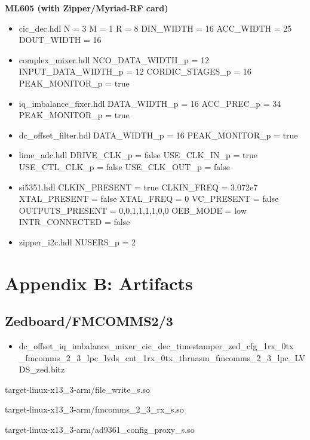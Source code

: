 \begin{minipage}[t]{.5\textwidth}
	\textbf{ML605 (with Zipper/Myriad-RF card)}
	\begin{itemize}
		\item cic\_dec.hdl
			\subitem N = 3
			\subitem M = 1
			\subitem R = 8
			\subitem DIN\_WIDTH = 16
			\subitem ACC\_WIDTH = 25
			\subitem DOUT\_WIDTH = 16
		\item complex\_mixer.hdl
			\subitem NCO\_DATA\_WIDTH\_p = 12
			\subitem INPUT\_DATA\_WIDTH\_p = 12
			\subitem CORDIC\_STAGES\_p = 16
			\subitem PEAK\_MONITOR\_p = true
		\item iq\_imbalance\_fixer.hdl
			\subitem DATA\_WIDTH\_p = 16
			\subitem ACC\_PREC\_p = 34
			\subitem PEAK\_MONITOR\_p = true
		\item dc\_offset\_filter.hdl
			\subitem DATA\_WIDTH\_p = 16
			\subitem PEAK\_MONITOR\_p = true
		\item lime\_adc.hdl
			\subitem DRIVE\_CLK\_p = false
			\subitem USE\_CLK\_IN\_p = true
			\subitem USE\_CTL\_CLK\_p = false
			\subitem USE\_CLK\_OUT\_p = false
		\item si5351.hdl
			\subitem CLKIN\_PRESENT = true
			\subitem CLKIN\_FREQ = 3.072e7
			\subitem XTAL\_PRESENT = false
			\subitem XTAL\_FREQ = 0
			\subitem VC\_PRESENT = false
			\subitem OUTPUTS\_PRESENT = 0,0,1,1,1,1,0,0
			\subitem OEB\_MODE = low
			\subitem INTR\_CONNECTED = false
		\item zipper\_i2c.hdl
			\subitem NUSERS\_p = 2
	\end{itemize}
\end{minipage}\newpage

\section{Appendix B: Artifacts}
\subsection{Zedboard/FMCOMMS2/3}
	\begin{itemize}
	\item dc\_offset\_iq\_imbalance\_mixer\_cic\_dec\_timestamper\_zed\_cfg\_1rx\_0tx \\ 
\_fmcomms\_2\_3\_lpc\_lvds\_cnt\_1rx\_0tx\_thruasm\_fmcomms\_2\_3\_lpc\_LVDS\_zed.bitz
	\end{itemize}
	\begin{itemize}
	\begin{minipage}[t]{.5\textwidth}
	\item target-linux-x13\_3-arm/file\_write\_s.so
	\item target-linux-x13\_3-arm/fmcomms\_2\_3\_rx\_s.so
	\item target-linux-x13\_3-arm/ad9361\_config\_proxy\_s.so
	\end{minipage}
	\end{itemize}
